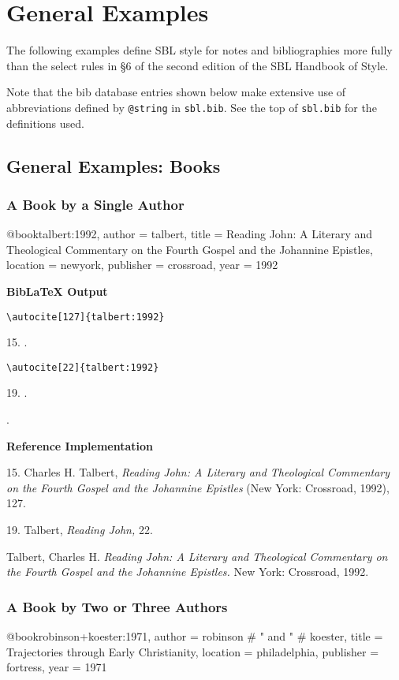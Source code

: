 \documentclass[a4paper]{article}
\newcommand\citetest[5]{%
  {\textbf{BibLaTeX Output}\par
   \nobreak
   \texttt{\textbackslash autocite[#2]\{#5\}}\par
   \color{biblatex-colour}
   #1. \cite[#2]{#5}.\par
   \color{black}
   \texttt{\textbackslash autocite[#4]\{#5\}}\par
   \color{biblatex-colour}
   #3. \cite[#4]{#5}.\par
   \hangindent\bibindent\bibentrycite{#5}.\par}}
\newenvironment{refimp}{%
  \begin{minipage}{\linewidth}
    \setlength{\parskip}{1ex}
    \textbf{Reference Implementation}\par
    \nobreak
    \color{reference-colour}
}{\end{minipage}}
\newenvironment{vb}{%
  \setlength{\parskip}{0pt}
  \verbatim}{\endverbatim}
\begin{document}
\setcounter{section}{5}

\section{General Examples}

The following examples define SBL style for notes and bibliographies more
fully than the select rules in §6 of the second edition of the SBL Handbook of
Style.

Note that the bib database entries shown below make extensive use of
abbreviations defined by \texttt{@string} in \texttt{sbl.bib}. See the top of
\texttt{sbl.bib} for the definitions used.

\setcounter{subsection}{1}
\subsection{General Examples: Books}

\subsubsection{A Book by a Single Author}

\begin{vb}
@book{talbert:1992,
  author = talbert,
  title = {Reading John: A Literary and Theological Commentary
           on the Fourth Gospel and the Johannine Epistles},
  location = newyork,
  publisher = crossroad,
  year = {1992}
}
\end{vb}

\citetest{15}{127}{19}{22}{talbert:1992}


\begin{refimp}
  15. Charles H. Talbert, \emph{Reading John: A Literary and Theological
  Commentary on the Fourth Gospel and the Johannine Epistles} (New York:
  Crossroad, 1992), 127.

  19. Talbert, \emph{Reading John,} 22.

  \hangindent\bibindent Talbert, Charles H. \emph{Reading John: A Literary and
  Theological Commentary on the Fourth Gospel and the Johannine Epistles.} New
  York: Crossroad, 1992.
\end{refimp}

\subsubsection{A Book by Two or Three Authors}

\begin{vb}
@book{robinson+koester:1971,
  author = robinson # " and " # koester,
  title = {Trajectories through Early Christianity},
  location = philadelphia,
  publisher = fortress,
  year = {1971}
}
\end{vb}  
\end{document}
